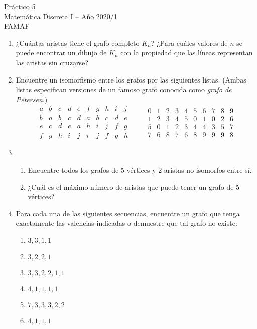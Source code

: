 \documentclass[12pt,spanish,makeidx]{amsbook}
\theoremstyle{definition}
\theoremstyle{remark}
\begin{document}
{\bf \begin{center} Práctico 5 \\ Matemática Discreta I -- Año 2020/1 \\ FAMAF \end{center}}

\medskip




\begin{enumerate}

\item  ¿Cuántas aristas tiene el  grafo completo $K_n$? ¿Para cuáles valores de $n$ se puede encontrar un dibujo de $K_n$ con la propiedad que las líneas representan las aristas sin cruzarse?


\medskip
\item Encuentre un isomorfismo entre los grafos por las siguientes listas. (Ambas listas especifican versiones de un famoso grafo conocida como {\it grafo de Petersen}.)
$$
\begin{matrix}
a&b&c&d&e&f&g&h&i&j\\ \hline
b&a&b&c&d&a&b&c&d&e\\
e&c&d&e&a&h&i&j&f&g\\
f&g&h&i&j&i&j&f&g&h
\end{matrix}
\qquad \begin{matrix}
0&1&2&3&4&5&6&7&8&9\\ \hline
1&2&3&4&5&0&1&0&2&6\\
5&0&1&2&3&4&4&3&5&7\\
7&6&8&7&6&8&9&9&9&8
\end{matrix}
$$

\medskip
\item
\begin{enumerate}
\item Encuentre todos los grafos de 5 vértices y 2 aristas no isomorfos entre sí.
 \item ¿Cuál es el máximo número de aristas que puede tener un grafo de 5 vértices?
\end{enumerate}

\medskip

\item Para cada una de las siguientes secuencias, encuentre un grafo que tenga exactamente las valencias indicadas o demuestre que tal grafo no existe:
\begin{multicols}{3}
\begin{enumerate}
\item $3,3,1,1$
\item $3,2,2,1$
\item $3,3,2,2,1,1$
\item $4,1,1,1,1$
\item $7,3,3,3,2,2$
\item $4,1,1,1$
\end{enumerate}
\end{multicols}


\end{enumerate}
\end{document}
